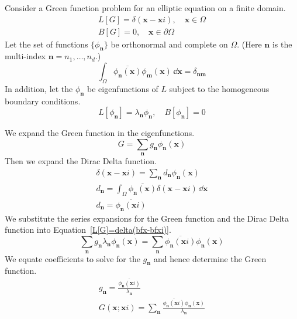 Consider a Green function problem for an elliptic equation on a 
finite domain.
\begin{gather}
  \label{L[G]=delta(bfx-bfxi)}
  L[G] = \delta(\mathbf{x} - \mathbf{x}i), \quad \mathbf{x} \in \Omega \\
  \nonumber
  B[G] = 0, \quad \mathbf{x} \in \partial \Omega
\end{gather}
Let the set of functions $\{ \phi_{\mathbf{n}} \}$ be orthonormal and
complete on $\Omega$.  (Here $\mathbf{n}$ is the multi-index 
$\mathbf{n} = n_1, \ldots, n_d$.) 
\[
\int_\Omega \overline{ \phi_{\mathbf{n}}(\mathbf{x}) } \phi_{\mathbf{m}}(\mathbf{x}) \,\dd \mathbf{x} 
= \delta_{\mathbf{n} \mathbf{m}}
\]
In addition, let the $\phi_{\mathbf{n}}$ be 
eigenfunctions of $L$ subject to the homogeneous boundary 
conditions.
\[
L \left[ \phi_{\mathbf{n}} \right] = \lambda_{\mathbf{n}} \phi_{\mathbf{n}}, \quad
B \left[ \phi_{\mathbf{n}} \right] = 0
\]

We expand the Green function in the eigenfunctions.
\[
G = \sum_{\mathbf{n}} g_{\mathbf{n}} \phi_{\mathbf{n}}(\mathbf{x})
\]
Then we expand the Dirac Delta function.
\begin{gather*}
  \delta(\mathbf{x} - \mathbf{x}i) = \sum_{\mathbf{n}} d_{\mathbf{n}} \phi_{\mathbf{n}}(\mathbf{x}) \\
  d_{\mathbf{n}} = \int_\Omega \overline{ \phi_{\mathbf{n}}(\mathbf{x}) } 
  \delta(\mathbf{x} - \mathbf{x}i) \,\dd \mathbf{x} \\
  d_{\mathbf{n}} = \overline{ \phi_{\mathbf{n}}(\mathbf{x}i) } 
\end{gather*}
We substitute the series expansions for the Green function and
the Dirac Delta function into Equation~\ref{L[G]=delta(bfx-bfxi)}.
\[
\sum_{\mathbf{n}} g_{\mathbf{n}} \lambda_{\mathbf{n}} \phi_{\mathbf{n}}(\mathbf{x})
= \sum_{\mathbf{n}} \overline{ \phi_{\mathbf{n}}(\mathbf{x}i) } \phi_{\mathbf{n}}(\mathbf{x}) 
\]
We equate coefficients to solve for the $g_{\mathbf{n}}$ and hence
determine the Green function.
\begin{gather*}
  g_{\mathbf{n}} = \frac{ \overline{ \phi_{\mathbf{n}}(\mathbf{x}i) } }{ \lambda_{\mathbf{n}} } \\
  G(\mathbf{x}; \mathbf{x}i) 
  = \sum_{\mathbf{n}} \frac{ \overline{ \phi_{\mathbf{n}}(\mathbf{x}i) } \phi_{\mathbf{n}}(\mathbf{x}) }
  { \lambda_{\mathbf{n}} } 
\end{gather*}








